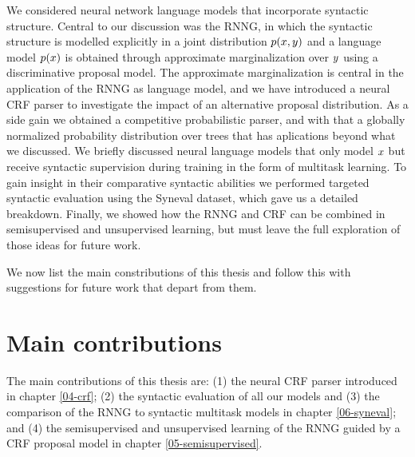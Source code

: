We considered neural network language models that incorporate syntactic structure. Central to our discussion was the RNNG, in which the syntactic structure is modelled explicitly in a joint distribution $p( x, y )$ and a language model $p(x)$ is obtained through approximate marginalization over $y$ using a discriminative proposal model. The approximate marginalization is central in the application of the RNNG as language model, and we have introduced a neural CRF parser to investigate the impact of an alternative proposal distribution. As a side gain we obtained a competitive probabilistic parser, and with that a globally normalized probability distribution over trees that has aplications beyond what we discussed. We briefly discussed neural language models that only model $x$ but receive syntactic supervision during training in the form of multitask learning. To gain insight in their comparative syntactic abilities we performed targeted syntactic evaluation using the Syneval dataset, which gave us a detailed breakdown. Finally, we showed how the RNNG and CRF can be combined in semisupervised and unsupervised learning, but must leave the full exploration of those ideas for future work.

We now list the main constributions of this thesis and follow this with suggestions for future work that depart from them.

\section{Main contributions}
  The main contributions of this thesis are: (1) the neural CRF parser introduced in chapter \ref{04-crf}; (2) the syntactic evaluation of all our models and (3) the comparison of the RNNG to syntactic multitask models in chapter \ref{06-syneval}; and (4) the semisupervised and unsupervised learning of the RNNG guided by a CRF proposal model in chapter \ref{05-semisupervised}.

